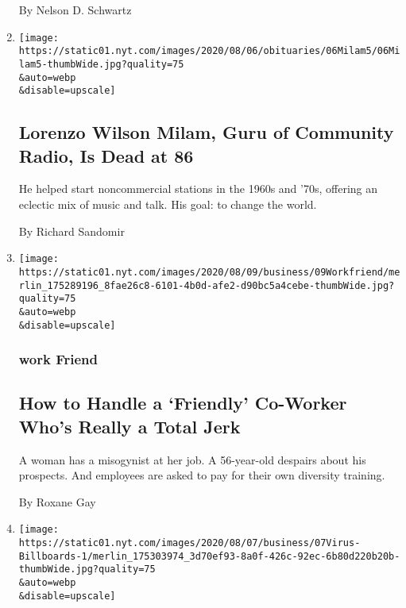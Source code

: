 \begin{enumerate}
  By Nelson D. Schwartz
\item
  \href{/2020/08/07/business/media/lorenzo-milam-dead.html}{}

  \texttt{[image: https://static01.nyt.com/images/2020/08/06/obituaries/06Milam5/06Milam5-thumbWide.jpg?quality=75\\\&auto=webp\\\&disable=upscale]}

  \hypertarget{lorenzo-wilson-milam-guru-of-community-radio-is-dead-at-86}{%
  \subsection{Lorenzo Wilson Milam, Guru of Community Radio, Is Dead at
  86}\label{lorenzo-wilson-milam-guru-of-community-radio-is-dead-at-86}}

  He helped start noncommercial stations in the 1960s and '70s, offering
  an eclectic mix of music and talk. His goal: to change the world.

  By Richard Sandomir
\item
  \href{/2020/08/07/business/how-to-handle-a-friendly-co-worker-whos-really-a-total-jerk.html}{}

  \texttt{[image: https://static01.nyt.com/images/2020/08/09/business/09Workfriend/merlin\_175289196\_8fae26c8-6101-4b0d-afe2-d90bc5a4cebe-thumbWide.jpg?quality=75\\\&auto=webp\\\&disable=upscale]}

  \hypertarget{work-friend}{%
  \subsubsection{work Friend}\label{work-friend}}

  \hypertarget{how-to-handle-a-friendly-co-worker-whos-really-a-total-jerk}{%
  \subsection{How to Handle a `Friendly' Co-Worker Who's Really a Total
  Jerk}\label{how-to-handle-a-friendly-co-worker-whos-really-a-total-jerk}}

  A woman has a misogynist at her job. A 56-year-old despairs about his
  prospects. And employees are asked to pay for their own diversity
  training.

  By Roxane Gay
\item
  \href{/2020/08/07/business/media/billboard-advertising-pandemic.html}{}

  \texttt{[image: https://static01.nyt.com/images/2020/08/07/business/07Virus-Billboards-1/merlin\_175303974\_3d70ef93-8a0f-426c-92ec-6b80d220b20b-thumbWide.jpg?quality=75\\\&auto=webp\\\&disable=upscale]}


\end{enumerate}
